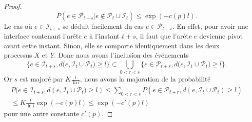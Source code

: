 \documentclass[titlepage,a4paper,12pt]{article}
\newcounter{th}
\begin{document}
\begin{proof}
$$P(e\in \mathcal{P}_{t+s}|e\notin \mathcal{P}_t\cup \mathcal{I}_t) \leqslant \exp(-c(p)l).
$$
Le cas où $e\in \mathcal{I}_{t+s}$ se déduit facilement du cas $e\in \mathcal{P}_{t+s}$. En effet, pour avoir une interface contenant l'arête $e$ à l'instant $t+s$, il faut que l'arête $e$ devienne pivot avant cette instant. Sinon, elle se comporte identiquement dans les deux processus $X$ et $Y$. Donc nous avons l'inclusion des événements 
$$ \big\{ e\in \mathcal{I}_{t+s}, d(e,\mathcal{I}_t \cup \mathcal{P}_{t}\big) \geqslant l\} \subset \bigcup_{0<r<s}\big\{ e\in \mathcal{P}_{t+r}, d(e,\mathcal{I}_t \cup \mathcal{P}_{t}\big) \geqslant l\}.
$$
Or $s$ est majoré par $\displaystyle K\frac{l}{\ln l}$, nous avons la majoration de la probabilité
\begin{multline*} P(e\in \mathcal{I}_{t+s}, d(e,\mathcal{I}_t \cup \mathcal{P}_{t}\big) \geqslant l) \leqslant \sum_{0<r<s} P(e\in \mathcal{P}_{t+r}, d(e,\mathcal{I}_t \cup \mathcal{P}_{t})\geqslant l) \\ \leqslant K\frac{l}{\ln l}\exp(-c(p)l)\leqslant \exp(-c'(p)l)
\end{multline*}
pour une autre constante $c'(p)$. 
\end{proof}
\end{document}
